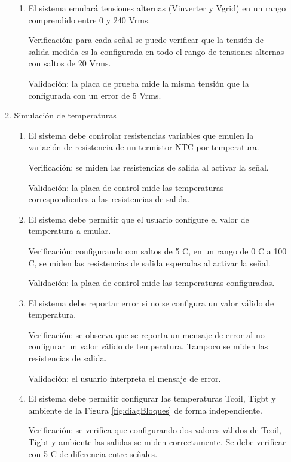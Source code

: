 \documentclass[
11pt, %
codirector, %
]{charter}
\begin{document}
\begin{enumerate}
\begin{enumerate}
\begin{enumerate}
			            \item El sistema emulará tensiones alternas (Vinverter y Vgrid) en un rango comprendido entre 0 y 240 Vrms.

			                  Verificación: para cada señal se puede verificar que la tensión de salida medida es la configurada en todo el rango de tensiones alternas con saltos de 20 Vrms.

			                  Validación: la placa de prueba mide la misma tensión que la configurada con un error de 5 Vrms.
		            \end{enumerate}
		      \item Simulación de temperaturas
		            \begin{enumerate}
			            \item El sistema debe controlar resistencias variables que emulen la variación de resistencia de un termistor NTC por temperatura.

			                  Verificación: se miden las resistencias de salida al activar la señal.

			                  Validación: la placa de control mide las temperaturas correspondientes a las resistencias de salida.
			            \item El sistema debe permitir que el usuario configure el valor de temperatura a emular.

			                  Verificación: configurando con saltos de 5 C, en un rango de 0 C a 100 C, se miden las resistencias de salida esperadas al activar la señal.

			                  Validación: la placa de control mide las temperaturas configuradas.
			            \item El sistema debe reportar error si no se configura un valor válido de temperatura.

			                  Verificación: se observa que se reporta un mensaje de error al no configurar un valor válido de temperatura. Tampoco se miden las resistencias de salida.

			                  Validación: el usuario interpreta el mensaje de error.
			            \item El sistema debe permitir configurar las temperaturas Tcoil, Tigbt y ambiente de la Figura \ref{fig:diagBloques} de forma independiente.

			                  Verificación: se verifica que configurando dos valores válidos de Tcoil, Tigbt y ambiente las salidas se miden correctamente. Se debe verificar con 5 C de diferencia entre señales.


\end{enumerate}
\end{enumerate}
\end{enumerate}
\end{document}
